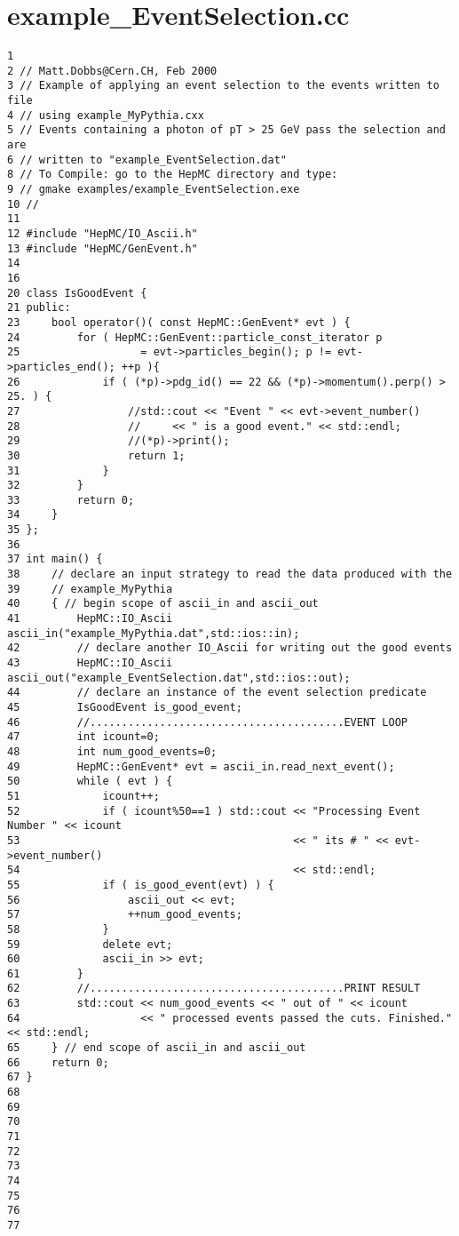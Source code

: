 \section{example\_\-Event\-Selection.cc}


\begin{DocInclude}\begin{verbatim}1 
2 // Matt.Dobbs@Cern.CH, Feb 2000
3 // Example of applying an event selection to the events written to file
4 // using example_MyPythia.cxx
5 // Events containing a photon of pT > 25 GeV pass the selection and are
6 // written to "example_EventSelection.dat"
8 // To Compile: go to the HepMC directory and type:
9 // gmake examples/example_EventSelection.exe
10 //
11 
12 #include "HepMC/IO_Ascii.h"
13 #include "HepMC/GenEvent.h"
14 
16 
20 class IsGoodEvent {
21 public:
23     bool operator()( const HepMC::GenEvent* evt ) { 
24         for ( HepMC::GenEvent::particle_const_iterator p 
25                   = evt->particles_begin(); p != evt->particles_end(); ++p ){
26             if ( (*p)->pdg_id() == 22 && (*p)->momentum().perp() > 25. ) {
27                 //std::cout << "Event " << evt->event_number()
28                 //     << " is a good event." << std::endl;
29                 //(*p)->print();
30                 return 1;
31             }
32         }
33         return 0;
34     }
35 };
36 
37 int main() { 
38     // declare an input strategy to read the data produced with the 
39     // example_MyPythia
40     { // begin scope of ascii_in and ascii_out
41         HepMC::IO_Ascii ascii_in("example_MyPythia.dat",std::ios::in);
42         // declare another IO_Ascii for writing out the good events
43         HepMC::IO_Ascii ascii_out("example_EventSelection.dat",std::ios::out);
44         // declare an instance of the event selection predicate
45         IsGoodEvent is_good_event;
46         //........................................EVENT LOOP
47         int icount=0;
48         int num_good_events=0;
49         HepMC::GenEvent* evt = ascii_in.read_next_event();
50         while ( evt ) {
51             icount++;
52             if ( icount%50==1 ) std::cout << "Processing Event Number " << icount
53                                           << " its # " << evt->event_number() 
54                                           << std::endl;
55             if ( is_good_event(evt) ) {
56                 ascii_out << evt;
57                 ++num_good_events;
58             }
59             delete evt;
60             ascii_in >> evt;
61         }
62         //........................................PRINT RESULT
63         std::cout << num_good_events << " out of " << icount 
64                   << " processed events passed the cuts. Finished." << std::endl;
65     } // end scope of ascii_in and ascii_out
66     return 0;
67 }
68 
69 
70 
71 
72 
73 
74 
75 
76 
77 
\end{verbatim}
\end{DocInclude}
 